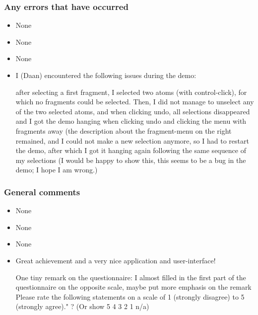 \subsubsection{Any errors that have occurred}
\begin{itemize}
\item None

\item None

\item None

\item I (Daan) encountered the following issues during the demo:


after selecting a first fragment, I selected two atoms (with control-click), for which no fragments could be selected. Then, I did not manage to unselect any of the two selected atoms, and when clicking undo, all selections disappeared and I got the demo hanging when clicking undo and clicking the menu with fragments away (the description about the fragment-menu on the right remained, and I could not make a new selection anymore, so I had to restart the demo, after which I got it hanging again following the same sequence of my selections (I would be happy to show this, this seems to be a bug in the demo; I hope I am wrong.)

\end{itemize}


\subsubsection{General comments}
\begin{itemize}
\item None

\item None

\item None

\item Great achievement and a very nice application and user-interface!





One tiny remark on the questionnaire:  I almost filled in the first part of the questionnaire on the opposite scale, maybe put more emphasis on the remark Please rate the following statements on a scale of 1 (strongly disagree) to 5 (strongly agree)."  ?   (Or show 5  4  3  2  1  n/a) 

\end{itemize}


